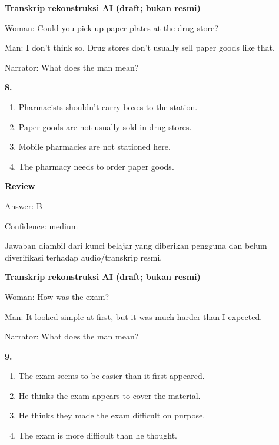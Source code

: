 \documentclass[12pt]{article}
\begin{document}
\begin{exampleblock}
\textbf{Transkrip rekonstruksi AI (draft; bukan resmi)}\par
Woman: Could you pick up paper plates at the drug store?\par
Man: I don't think so. Drug stores don't usually sell paper goods like that.\par
Narrator: What does the man mean?\par
\end{exampleblock}
\noindent\textbf{8.}
\begin{enumerate}[label=(\Alph*),leftmargin=*,itemsep=0.2em]
\item Pharmacists shouldn't carry boxes to the station.
\item Paper goods are not usually sold in drug stores.
\item Mobile pharmacies are not stationed here.
\item The pharmacy needs to order paper goods.
\end{enumerate}
\par
\begingroup
\setlength{\parskip}{0pt}
\setlength{\parindent}{0pt}
\textbf{Review}\par
Answer: B\par
Confidence: medium\par
Jawaban diambil dari kunci belajar yang diberikan pengguna dan belum diverifikasi terhadap audio/transkrip resmi.\par
\endgroup
\par
\vspace{0.25\baselineskip}
\begin{exampleblock}
\textbf{Transkrip rekonstruksi AI (draft; bukan resmi)}\par
Woman: How was the exam?\par
Man: It looked simple at first, but it was much harder than I expected.\par
Narrator: What does the man mean?\par
\end{exampleblock}
\noindent\textbf{9.}
\begin{enumerate}[label=(\Alph*),leftmargin=*,itemsep=0.2em]
\item The exam seems to be easier than it first appeared.
\item He thinks the exam appears to cover the material.
\item He thinks they made the exam difficult on purpose.
\item The exam is more difficult than he thought.
\end{enumerate}
\end{document}
